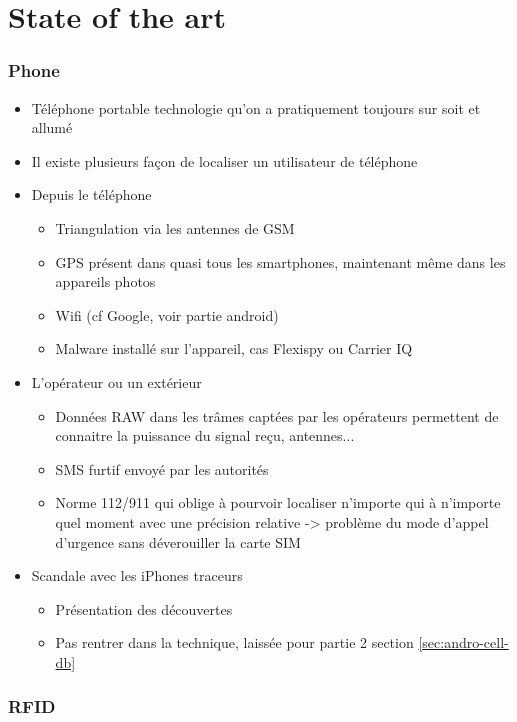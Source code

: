 \part{State of the art}
\label{chap:general}

\section*{Phone}

\begin{itemize}
\item Téléphone portable technologie qu'on a pratiquement toujours sur soit et allumé
\item Il existe plusieurs façon de localiser un utilisateur de téléphone
\item Depuis le téléphone
  \begin{itemize}
  \item Triangulation via les antennes de GSM
  \item GPS présent dans quasi tous les smartphones, maintenant même dans les appareils photos
  \item Wifi (cf Google, voir partie android)
  \item Malware installé sur l'appareil, cas Flexispy ou Carrier IQ
  \end{itemize}
\item L'opérateur ou un extérieur
  \begin{itemize}
  \item Données RAW dans les trâmes captées par les opérateurs permettent de connaitre la puissance du signal reçu, antennes...
  \item SMS furtif envoyé par les autorités
  \item Norme 112/911 qui oblige à pourvoir localiser n'importe qui à n'importe quel moment avec une précision relative -> problème du mode d'appel d'urgence sans déverouiller la carte SIM
  \end{itemize}
\item Scandale avec les iPhones traceurs
  \begin{itemize}
  \item Présentation des découvertes
  \item Pas rentrer dans la technique, laissée pour partie 2 section \ref{sec:andro-cell-db}
  \end{itemize}
\end{itemize}

\section*{RFID}

